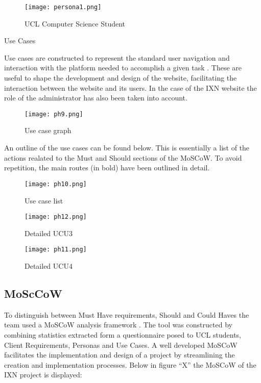 \documentclass[fontsize=10pt]{extarticle}
\numberwithin{figure}{section} %
\begin{document}
\begin{figure}[H]
      \centering
      \texttt{[image: persona1.png]}
      \caption{UCL Computer Science Student}
\end{figure}

Use Cases

Use cases are constructed to represent the standard user navigation and
interaction with the platform needed to accomplish a given task
\cite{g3}. These are useful to shape the development and design of the
website, facilitating the interaction between the website and its users.
In the case of the IXN website the role of the administrator has also
been taken into account.

\begin{figure}[H]
      \centering
      \texttt{[image: ph9.png]}
      \caption{Use case graph}
\end{figure}

An outline of the use cases can be found below. This is essentially a
list of the actions realated to the Must and Should sections of the
MoSCoW. To avoid repetition, the main routes (in bold) have been
outlined in detail.

\begin{figure}[H]
      \centering
      \texttt{[image: ph10.png]}
      \caption{Use case list}
 \end{figure}

\begin{figure}[H]
      \centering
      \texttt{[image: ph12.png]}
      \caption{Detailed UCU3}
 \end{figure}

\begin{figure}[H]
      \centering
      \texttt{[image: ph11.png]}
      \caption{Detailed UCU4}
 \end{figure}

\hypertarget{mosccow}{%
\subsection{MoScCoW}\label{mosccow}}

To distinguish between Must Have requirements, Should and Could Haves
the team used a MoSCoW analysis framework \cite{g4}. The tool was
constructed by combining statistics extracted form a questionnaire posed
to UCL students, Client Requirements, Personas and Use Cases. A well
developed MoSCoW facilitates the implementation and design of a project
by streamlining the creation and implementation processes. Below in
figure ``X'' the MoSCoW of the IXN project is displayed:
\end{document}
